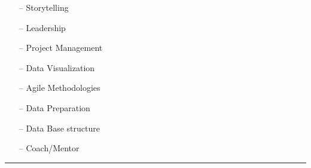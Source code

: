\begin{multicols}{2}
{{            \setlength{\columnsep}{2mm}
            \begin{multicols}{2}
                \begin{itemize}[leftmargin=4mm]
                    \itemsep-1mm
                    \item[--] Storytelling
                    \item[--] Leadership
                    \item[--] Project Management
                    \item[--] Data Visualization
                    \item[--] Agile Methodologies
                    \item[--] Data Preparation
                    \item[--] Data Base structure
                    \item[--] Coach/Mentor
                \end{itemize}
            \end{multicols}
            \vspace*{-2mm}
        }
    }

\end{multicols}

\vspace*{-8mm}

\begin{center}
    \par\rule{1.0\textwidth}{0.6pt}
\end{center}

\vspace*{-8mm}


